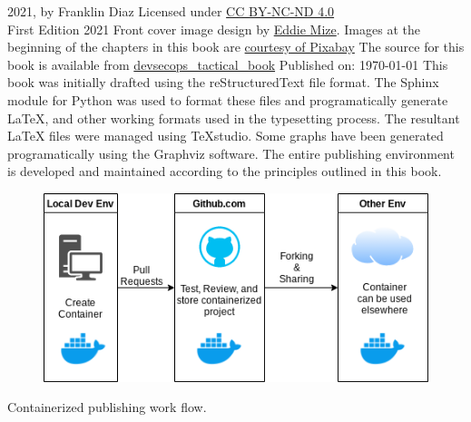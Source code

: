 \justify{}
\textcopyright{} 2021, by Franklin Diaz
\justify{}
Licensed under \href{https://creativecommons.org/licenses/by-nc-nd/4.0/}{CC BY-NC-ND 4.0} 
\faCreativeCommons\ \faCreativeCommonsBy\ \faCreativeCommonsSa\
\vspace{5mm}\\
First Edition 2021
\justify{}
Front cover image design by {\href{https://www.linkedin.com/in/eddiemize/}{Eddie Mize}}.
Images at the beginning of the chapters in this book are
\href{https://pixabay.com/service/terms/#license}{courtesy of Pixabay}
\justify{}
The source for this book is available from 
{\href{https://github.com/thedevilsvoice/devsecops\_tactical\_book}{devsecops\_tactical\_book}}
\vspace{3mm}
Published on: \today
\justify{}
This book was initially drafted using the reStructuredText file format.
The Sphinx module for Python was used to format these files and programatically
generate LaTeX, and other working formats used in the typesetting process. The
resultant LaTeX files were managed using TeXstudio.
\justify{}
Some graphs have been generated programatically using the Graphviz software.
The entire publishing environment is developed and maintained according
to the principles outlined in this book.
\vspace{5mm}
\centering
\vspace{0mm}
\begin{figure}[!htb]
	\centering
	\includegraphics[scale=0.75]{../images/workflow.png}
\end{figure}
\vspace{2mm}
Containerized publishing work flow.
